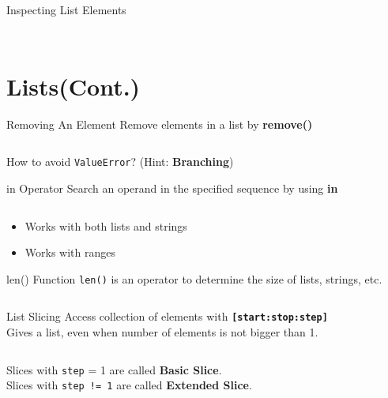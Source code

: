         \begin{frame}{Inspecting List Elements}
            \LARGE
            \inputminted[frame=single,framesep=2pt]{python3}{../Lecture3/code-examples/slicing3.py}
            \inputminted[frame=single,framesep=2pt]{python3}{../Lecture3/code-examples/slicing4.py}
        \end{frame}

    \section{Lists(Cont.)}
        \begin{frame}{Removing An Element}
            \pause
            \LARGE
            Remove elements in a list by \textbf{remove()}
            \pause              
            \bigskip
            \normalsize
            \inputminted[frame=single,framesep=2pt]{python3}{../Lecture3/code-examples/remove.py}
            \pause
            \LARGE
            How to avoid \texttt{ValueError}? \pause (Hint: \textbf{Branching})
        \end{frame}

        \begin{frame}{in Operator}
            \pause
            \LARGE
            Search an operand in the specified sequence by using \textbf{in}
            \pause
            \bigskip
            \inputminted[frame=single,framesep=2pt]{python3}{../Lecture3/code-examples/in_operator.py}
            \pause
            \begin{itemize}
                \item Works with both lists and strings
                \pause
                \item Works with ranges
            \end{itemize}
        \end{frame}

        \begin{frame}{len() Function}
            \pause
            \LARGE
            \texttt{len()} is an operator to determine the size of lists, strings, etc.
            \pause
            \bigskip
            \inputminted[frame=single,framesep=2pt]{python3}{../Lecture3/code-examples/length.py}
        \end{frame}

        \begin{frame}{List Slicing}
            \Large
            Access collection of elements with \textbf{\texttt{[start:stop:step]}}\\
            Gives a list, even when number of elements is not bigger than 1.
            \inputminted[frame=single,framesep=2pt,firstline=10]{python3}{../Review1/code-examples/slicing.py}                                
            \LARGE
            Slices with \texttt{step} = 1 are called \textbf{Basic Slice}.\\
            Slices with \texttt{step != 1} are called \textbf{Extended Slice}.
        \end{frame}

